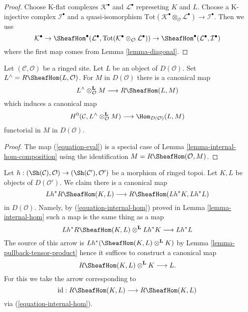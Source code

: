 \begin{proof}
Choose K-flat complexes $\mathcal{K}^\bullet$ and $\mathcal{L}^\bullet$
represeting $K$ and $L$. Choose a K-injective complex $\mathcal{I}^\bullet$
and a quasi-isomorphism
$\text{Tot}(\mathcal{K}^\bullet \otimes_\mathcal{O} \mathcal{L}^\bullet)
\to \mathcal{I}^\bullet$. Then we use
$$
\mathcal{K}^\bullet \to
\SheafHom^\bullet(\mathcal{L}^\bullet,
\text{Tot}(\mathcal{K}^\bullet \otimes_\mathcal{O} \mathcal{L}^\bullet))
\to
\SheafHom^\bullet(\mathcal{L}^\bullet, \mathcal{I}^\bullet)
$$
where the first map comes from Lemma \ref{lemma-diagonal}.
\end{proof}

\begin{lemma}
\label{lemma-dual}
Let $(\mathcal{C}, \mathcal{O})$ be a ringed site. Let $L$ be an
object of $D(\mathcal{O})$. Set $L^\wedge = R\SheafHom(L, \mathcal{O})$.
For $M$ in $D(\mathcal{O})$ there is a canonical map
\begin{equation}
\label{equation-eval}
L^\wedge \otimes^\mathbf{L}_\mathcal{O} M \longrightarrow R\SheafHom(L, M)
\end{equation}
which induces a canonical map
$$
H^0(\mathcal{C}, L^\wedge \otimes_\mathcal{O}^\mathbf{L} M)
\longrightarrow
\Hom_{D(\mathcal{O})}(L, M)
$$
functorial in $M$ in $D(\mathcal{O})$.
\end{lemma}

\begin{proof}
The map (\ref{equation-eval}) is a special case of
Lemma \ref{lemma-internal-hom-composition}
using the identification $M = R\SheafHom(\mathcal{O}, M)$.
\end{proof}

\begin{remark}
\label{remark-prepare-fancy-base-change}
Let $h : (\Sh(\mathcal{C}), \mathcal{O}) \to (\Sh(\mathcal{C}'), \mathcal{O}')$
be a morphism of ringed topoi. Let $K, L$ be objects of $D(\mathcal{O}')$.
We claim there is a canonical map
$$
Lh^*R\SheafHom(K, L) \longrightarrow R\SheafHom(Lh^*K, Lh^*L)
$$
in $D(\mathcal{O})$. Namely, by (\ref{equation-internal-hom})
proved in Lemma \ref{lemma-internal-hom}
such a map is the same thing as a map
$$
Lh^*R\SheafHom(K, L) \otimes^\mathbf{L} Lh^*K \longrightarrow Lh^*L
$$
The source of this arrow is $Lh^*(\SheafHom(K, L) \otimes^\mathbf{L} K)$
by Lemma \ref{lemma-pullback-tensor-product}
hence it suffices to construct a canonical map
$$
R\SheafHom(K, L) \otimes^\mathbf{L} K \longrightarrow L.
$$
For this we take the arrow corresponding to
$$
\text{id} :
R\SheafHom(K, L)
\longrightarrow
R\SheafHom(K, L)
$$
via (\ref{equation-internal-hom}).
\end{remark}

